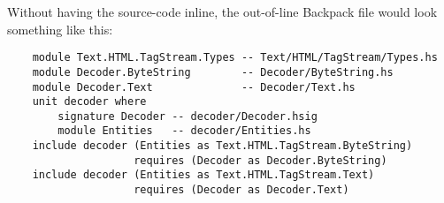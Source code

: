 \documentclass{article}
\begin{document}
Without having the source-code inline, the out-of-line Backpack file
would look something like this:

\begin{verbatim}
    module Text.HTML.TagStream.Types -- Text/HTML/TagStream/Types.hs
    module Decoder.ByteString        -- Decoder/ByteString.hs
    module Decoder.Text              -- Decoder/Text.hs
    unit decoder where
        signature Decoder -- decoder/Decoder.hsig
        module Entities   -- decoder/Entities.hs
    include decoder (Entities as Text.HTML.TagStream.ByteString)
                    requires (Decoder as Decoder.ByteString)
    include decoder (Entities as Text.HTML.TagStream.Text)
                    requires (Decoder as Decoder.Text)
\end{verbatim}
\end{document}
